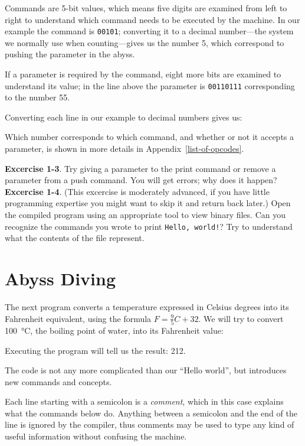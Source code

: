 \documentclass[11pt,a4paper,draft]{book}
\begin{document}
Commands are 5-bit values, which means five digits are examined from
left to right to understand which command needs to be executed by the
machine. In our example the command is \verb|00101|; converting it to
a decimal number---the system we normally use when counting---gives us
the number \num{5}, which correspond to pushing the parameter in the
abyss.

If a parameter is required by the command, eight more bits are
examined to understand its value; in the line above the parameter is
\verb|00110111| corresponding to the number \num{55}.

Converting each line in our example to decimal numbers gives us:


Which number corresponds to which command, and whether or not it
accepts a parameter, is shown in more details in
Appendix~\ref{list-of-opcodes}.

\textbf{Excercise 1-3}. Try giving a parameter to the print command or
remove a parameter from a push command. You will get errors; why does
it happen? \\
\textbf{Excercise 1-4}. (This excercise is moderately advanced, if you
have little programming expertise you might want to skip it and return
back later.) Open the compiled program using an appropriate tool to
view binary files. Can you recognize the commands you wrote to print
\verb|Hello, world!|? Try to understand what the contents of the file
represent.

\section{Abyss Diving}
The next program converts a temperature expressed in Celsius degrees
into its Fahrenheit equivalent, using the formula \(F = \frac{9}{5}C + 32\).
We will try to convert \qty[mode=text]{100}{\degreeCelsius}, the
boiling point of water, into its Fahrenheit value:


Executing the program will tell us the result:
\qty[mode=text]{212}{\degreeFahrenheit}.

The code is not any more complicated than our \enquote{Hello world},
but introduces new commands and concepts.

Each line starting with a semicolon is a \emph{comment}, which in this
case explains what the commands below do. Anything between a semicolon
and the end of the line is ignored by the compiler, thus comments may
be used to type any kind of useful information without confusing the
machine.
\end{document}
